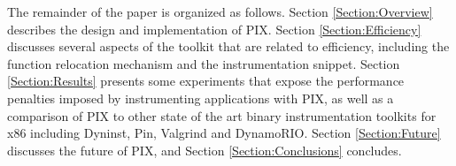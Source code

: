 The remainder of the paper is organized as follows. Section
\ref{Section:Overview} describes the design and implementation of PIX.
Section \ref{Section:Efficiency} discusses
several aspects of the toolkit that are related to efficiency, including the function relocation mechanism and the
instrumentation snippet. Section \ref{Section:Results} presents some
experiments that expose the performance penalties imposed by instrumenting applications with PIX, as well as
a comparison of PIX to other state of the art binary instrumentation toolkits for x86 including Dyninst, Pin, Valgrind and DynamoRIO. Section
\ref{Section:Future} discusses the future of PIX, and Section \ref{Section:Conclusions} concludes.

